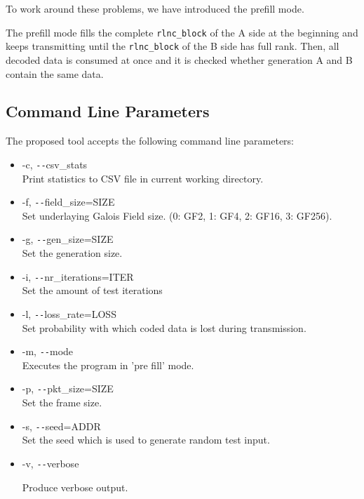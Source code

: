 \documentclass[a4paper,english,10pt]{tumarticle}
\begin{document}
To work around these problems, we have introduced the prefill mode.

The prefill mode fills the complete \texttt{rlnc\_block} of the A side at the beginning and keeps transmitting until the 
\texttt{rlnc\_block} of the B side has full rank. Then, all decoded data is consumed at once and it is checked 
whether generation A and B contain the same data.

\subsection{Command Line Parameters}\label{app:cmd}
The proposed tool accepts the following command line parameters:

\begin{itemize}
    \item -c, \texttt{-{}-}csv\_stats\\
    Print statistics to CSV file in current working directory.

    \item -f, \texttt{-{}-}field\_size=SIZE\\
    Set underlaying Galois Field size. (0: GF2, 1: GF4, 2: GF16, 3: GF256).

    \item -g, \texttt{-{}-}gen\_size=SIZE\\
    Set the generation size.

    \item -i, \texttt{-{}-}nr\_iterations=ITER\\
    Set the amount of test iterations

    \item -l, \texttt{-{}-}loss\_rate=LOSS\\
    Set probability with which coded data is lost during transmission.

    \item -m, \texttt{-{}-}mode\\
    Executes the program in 'pre fill' mode.

    \item -p, \texttt{-{}-}pkt\_size=SIZE\\
    Set the frame size.

    \item -s, \texttt{-{}-}seed=ADDR\\
    Set the seed which is used to generate random test input.

    \item -v, \texttt{-{}-}verbose

    Produce verbose output.
\end{itemize}
\end{document}
